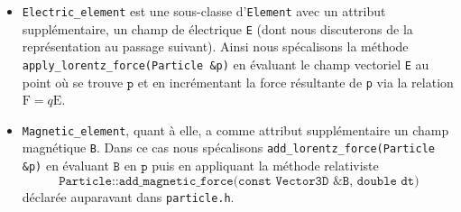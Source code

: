 \documentclass[12pt, letterpaper, twoside]{article}
\newcommand{\T}[1]{\texttt{#1}}
\begin{document}
\begin{itemize}
\item \T{Electric\_element} est une sous-classe d'\T{Element} avec un attribut supplémentaire, un champ de électrique \T{E} (dont nous discuterons de la représentation au passage suivant). Ainsi nous spécalisons la méthode \T{apply\_lorentz\_force(Particle \&p)} en évaluant le champ vectoriel \T{E} au point où se trouve $\T{p}$ et en incrémentant la force résultante de \T{p} via la relation $\boldsymbol{\mathrm{F}}=q\boldsymbol{\mathrm{E}}$.

\item \T{Magnetic\_element}, quant à elle, a comme attribut supplémentaire un champ magnétique \T{B}. Dans ce cas nous spécalisons \T{add\_lorentz\_force(Particle \&p)} en évaluant $\T{B}$ en $\T{p}$ puis en appliquant la méthode relativiste $$\T{Particle::add\_magnetic\_force(const Vector3D \&B, double dt)}$$ déclarée auparavant dans \T{particle.h}.

\end{itemize}
\end{document}

